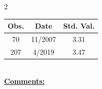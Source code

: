 
\bigskip 
\begin{multicols}{2}{ 
\begin{tabular}{ccc}
\hline  Obs.  &  Date &  Std. Val. \\ 
\hline 
                       70 &       11/2007 &          3.31 \vspace{-.12in} \\  
                      207 &        4/2019 &          3.47 \vspace{-.12in} \\  
 \end{tabular} 
\\ 
 \columnbreak 
 \singlespacing 
 \underline{\textbf{Comments:}} \\ 
 \bigskip       

 } 
\end{multicols} 
